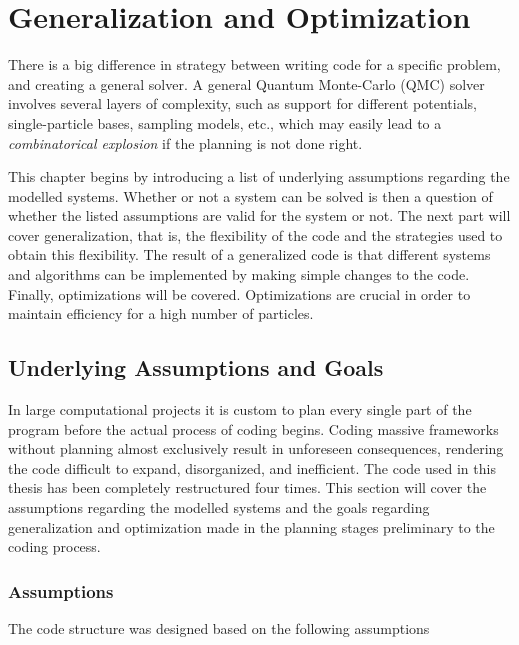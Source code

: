 \chapter{Generalization and Optimization}
\label{ch:optAndGen}

There is a big difference in strategy between writing code for a specific problem, and creating a general solver. A general Quantum Monte-Carlo (QMC) solver involves several layers of complexity, such as support for different potentials, single-particle bases, sampling models, etc., which may easily lead to a \textit{combinatorical explosion} if the planning is not done right. 

This chapter begins by introducing a list of underlying assumptions regarding the modelled systems. Whether or not a system can be solved is then a question of whether the listed assumptions are valid for the system or not. The next part will cover generalization, that is, the flexibility of the code and the strategies used to obtain this flexibility. The result of a generalized code is that different systems and algorithms can be implemented by making simple changes to the code. Finally, optimizations will be covered. Optimizations are crucial in order to maintain efficiency for a high number of particles. 

\section{Underlying Assumptions and Goals}
\label{sec:AssGoal}

In large computational projects it is custom to plan every single part of the program before the actual process of coding begins. Coding massive frameworks without planning almost exclusively result in unforeseen consequences, rendering the code difficult to expand, disorganized, and inefficient. The code used in this thesis has been completely restructured four times. This section will cover the assumptions regarding the modelled systems and the goals regarding generalization and optimization made in the planning stages preliminary to the coding process.

\subsection{Assumptions}
\label{sec:ass}

The code structure was designed based on the following assumptions

